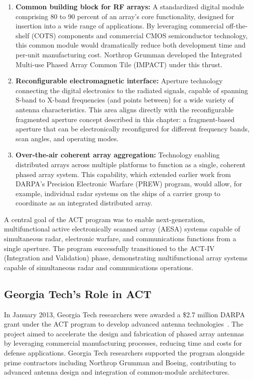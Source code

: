 \begin{enumerate}
\item \textbf{Common building block for RF arrays:} A standardized digital module comprising 80 to 90 percent of an array's core functionality, designed for insertion into a wide range of applications.  By leveraging commercial off-the-shelf (COTS) components and commercial CMOS semiconductor technology, this common module would dramatically reduce both development time and per-unit manufacturing cost.  Northrop Grumman developed the Integrated Multi-use Phased Array Common Tile (IMPACT) under this thrust.

\item \textbf{Reconfigurable electromagnetic interface:} Aperture technology connecting the digital electronics to the radiated signals, capable of spanning S-band to X-band frequencies (and points between) for a wide variety of antenna characteristics.  This area aligns directly with the reconfigurable fragmented aperture concept described in this chapter: a fragment-based aperture that can be electronically reconfigured for different frequency bands, scan angles, and operating modes.

\item \textbf{Over-the-air coherent array aggregation:} Technology enabling distributed arrays across multiple platforms to function as a single, coherent phased array system.  This capability, which extended earlier work from DARPA's Precision Electronic Warfare (PREW) program, would allow, for example, individual radar systems on the ships of a carrier group to coordinate as an integrated distributed array.
\end{enumerate}

A central goal of the ACT program was to enable next-generation, multifunctional active electronically scanned array (AESA) systems capable of simultaneous radar, electronic warfare, and communications functions from a single aperture.  The program successfully transitioned to the ACT-IV (Integration and Validation) phase, demonstrating multifunctional array systems capable of simultaneous radar and communications operations.

\subsection{Georgia Tech's Role in ACT}

In January 2013, Georgia Tech researchers were awarded a \$2.7 million DARPA grant under the ACT program to develop advanced antenna technologies~\cite{DARPAact2013}.  The project aimed to accelerate the design and fabrication of phased array antennas by leveraging commercial manufacturing processes, reducing time and costs for defense applications.  Georgia Tech researchers supported the program alongside prime contractors including Northrop Grumman and Boeing, contributing to advanced antenna design and integration of common-module architectures.

